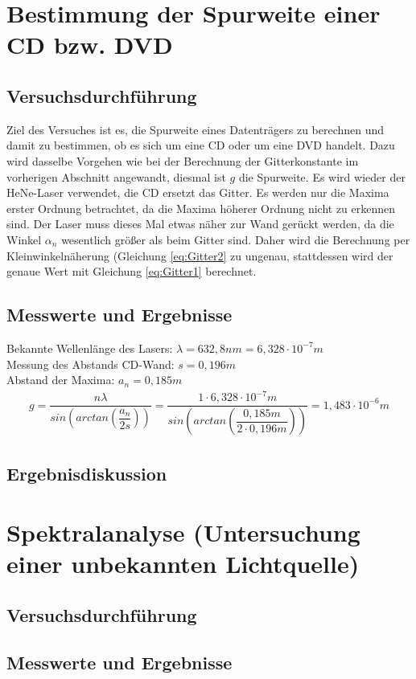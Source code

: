 \documentclass{scrartcl}
\begin{document}
\section{Bestimmung der Spurweite einer CD bzw. DVD}
\subsection{Versuchsdurchführung}
Ziel des Versuches ist es, die Spurweite eines Datenträgers zu berechnen und damit zu bestimmen, ob es sich um eine CD oder um eine DVD handelt. Dazu wird dasselbe Vorgehen wie bei der Berechnung der Gitterkonstante im vorherigen Abschnitt angewandt, diesmal ist $g$ die Spurweite. Es wird wieder der HeNe-Laser verwendet, die CD ersetzt das Gitter. Es werden nur die Maxima erster Ordnung betrachtet, da die Maxima höherer Ordnung nicht zu erkennen sind. Der Laser muss dieses Mal etwas näher zur Wand gerückt werden, da die Winkel $\alpha_{n}$ wesentlich größer als beim Gitter sind. Daher wird die Berechnung per Kleinwinkelnäherung (Gleichung \ref{eq:Gitter2} zu ungenau, stattdessen wird der genaue Wert mit Gleichung \ref{eq:Gitter1} berechnet.
\subsection{Messwerte und Ergebnisse}
Bekannte Wellenlänge des Lasers: $\lambda = 632,8nm = 6,328 \cdot 10^{-7}m$ \\
Messung des Abstands CD-Wand: $s = 0,196m$ \\
Abstand der Maxima: $a_{n} = 0,185m$
\begin{align*}
g = \dfrac{n \lambda}{sin \left( arctan \left( \dfrac{a_{n}}{2s} \right) \right) } = \dfrac{1 \cdot 6,328 \cdot 10^{-7}m}{sin \left( arctan \left( \dfrac{0,185m}{2 \cdot 0,196m} \right) \right) } = 1,483 \cdot 10^{-6}m
\end{align*}
\subsection{Ergebnisdiskussion}

\section{Spektralanalyse (Untersuchung einer unbekannten Lichtquelle)}
\subsection{Versuchsdurchführung}
\subsection{Messwerte und Ergebnisse}
\end{document}
